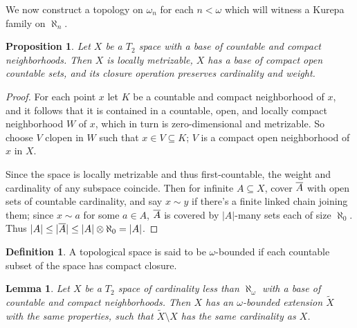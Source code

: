 \documentclass{amsart}
\theoremstyle{plain}
\newtheorem{lemma}[theorem]{Lemma}
\newtheorem{proposition}[theorem]{Proposition}
\theoremstyle{definition}
\newtheorem{definition}[theorem]{Definition}
\theoremstyle{remark}
\theoremstyle{plain}
\theoremstyle{definition}
\theoremstyle{remark}
\begin{document}
  We now construct a topology on \(\omega_n\) for each \(n<\omega\) which
  will witness a Kurepa family on \(\aleph_n\).

  \begin{proposition}
    Let \(X\) be a \(T_2\) space with a base of countable and compact
    neighborhoods.
    Then \(X\) is locally metrizable, \(X\)
    has a base of compact open countable sets,
    and its closure operation preserves cardinality and weight.
  \end{proposition}

  \begin{proof}
    For each point \(x\) let \(K\) be a countable and compact neighborhood
    of \(x\), and it follows that it is contained in a countable, open,
    and locally compact neighborhood \(W\) of \(x\), which in turn
    is zero-dimensional and metrizable. So choose \(V\) clopen
    in \(W\) such that \(x\in V\subseteq K\); \(V\) is a compact open
    neighborhood of \(x\) in \(X\).

    Since the space is locally metrizable and thus first-countable,
    the weight and cardinality of any
    subspace coincide. Then for infinite \(A\subseteq X\), cover \(\overline{A}\) with
    open sets of countable cardinality, and say
    \(x\sim y\) if there's a finite linked chain joining them; since
    \(x\sim a\) for some \(a\in A\), \(\overline{A}\) is covered by
    \(|A|\)-many sets each of size \(\aleph_0\). Thus
    \(|A|\leq|\overline{A}|\leq|A|\otimes\aleph_0=|A|\).
  \end{proof}

  \begin{definition}
    A topological space is said to be \(\omega\)-bounded if each countable
    subset of the space has compact closure.
  \end{definition}

  \begin{lemma}
    Let \(X\) be a \(T_2\) space of cardinality less than
    \(\aleph_\omega\) with a base of countable and compact neighborhoods.
    Then \(X\) has an \(\omega\)-bounded extension \(\tilde X\)
    with the same properties,
    such that \(\tilde X\setminus X\) has the same cardinality
    as \(X\).
  \end{lemma}
\end{document}
